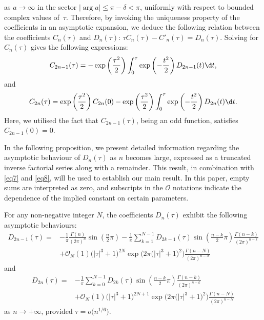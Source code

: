 as $a\to \infty$ in the sector $|\arg a| \le \pi-\delta<\pi$, uniformly with respect to bounded complex values of~$\tau$. Therefore, by invoking the uniqueness property of the coefficients in an asymptotic expansion, we deduce the following relation between the coefficients $C_n(\tau)$ and $D_n(\tau)$: $\tau C_n (\tau ) - C'_n (\tau ) = D_n (\tau )$. Solving for $C_n(\tau)$ gives the following expressions:
\begin{equation}\label{eq7}
C_{2n-1} (\tau ) = -\exp \left(\frac{\tau^2}{2} \right)\int_0^\tau \exp \left(- \frac{t^2 }{2}\right)D_{2n-1} (t)\d t,
\end{equation}
and
\begin{equation}\label{eq8}
C_{2n} (\tau ) = \exp \left(\frac{\tau^2}{2}\right) C_{2n} (0) - \exp \left( \frac{\tau^2}{2}\right)\int_0^\tau \exp \left(-\frac{t^2}{2}\right)D_{2n} (t)\d t.
\end{equation}
Here, we utilised the fact that $C_{2n-1} (\tau )$, being an odd function, satisfies $C_{2n-1} (0)=0$.

In the following proposition, we present detailed information regarding the asymptotic behaviour of $D_n(\tau)$ as $n$ becomes large, expressed as a truncated inverse factorial series along with a remainder. This result, in combination with \eqref{eq7} and \eqref{eq8}, will be used to establish our main result. In this paper, empty sums are interpreted as zero, and subscripts in the $\mathcal{O}$ notations indicate the dependence of the implied constant on certain parameters.

\begin{Proposition}\label{prop1} For any non-negative integer $N$, the coefficients $D_n(\tau)$ exhibit the following asymptotic behaviours:
\begin{align}
D_{2n - 1} (\tau ) ={}& -\frac{1}{\pi}\frac{\Gamma (n)}{(2\pi )^n } \sin \left( \frac{n}{2}\pi \right) -\frac{1}{\pi}\sum_{k = 1}^{N - 1} D_{2k - 1} (\tau )\sin \left( \frac{n - k}{2}\pi \right)\frac{\Gamma (n - k)}{(2\pi )^{n - k}}\nonumber \\ & +\mathcal{O}_N (1)\bigl(\left| \tau \right|^3 + 1\bigr)^{2N} \exp \big( 2\pi \bigl(\left| \tau \right|^3 + 1\bigr)^2 \big)\frac{\Gamma (n - N)}{(2\pi )^{n - N}}\label{eq10}
\end{align}
and
\begin{align}
D_{2n} (\tau ) ={}& -\frac{1}{\pi}\sum_{k = 0}^{N - 1} D_{2k} (\tau )\sin \left( \frac{n - k}{2}\pi \right)\frac{\Gamma (n - k)}{(2\pi )^{n - k}} \nonumber\\ & +\mathcal{O}_N (1)\bigl(\left| \tau \right|^3 + 1\bigr)^{2N+1} \exp \big( 2\pi \bigl(\left| \tau \right|^3 + 1\bigr)^2 \big)\frac{\Gamma (n - N)}{(2\pi )^{n - N}}\label{eq11}
\end{align}
as $n\to+\infty$, provided $\tau = o\big(n^{1/6}\big)$.
\end{Proposition}

